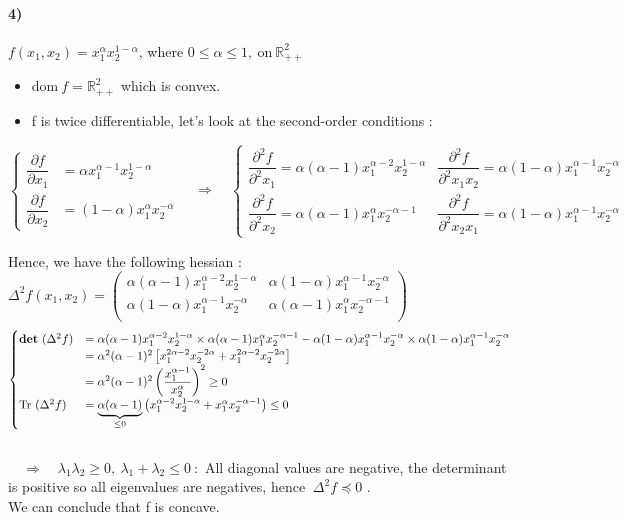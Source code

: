 \documentclass[12pt,a4paper]{article}
\begin{document}
\paragraph{4)} $ f(x_1,x_2)=x_1^{\alpha} x_2^{1-\alpha} $, where $ 0 \leq \alpha \leq 1,~\text{on}~ \mathbb{R}^2_{++} $
\begin{itemize}
	\item $ \text{dom} ~f=\mathbb{R}^2_{++} $ which is convex.
	\item f is twice differentiable, let's look at the second-order conditions :\\
 \end{itemize}
 \begin{center} 
$$	\begin{cases}
	\dfrac{\partial f}{\partial x_1} &=\alpha x_1^{\alpha -1}x_2^{1-\alpha} \\
	\dfrac{\partial f}{\partial x_2} &=(1-\alpha) x_1^{\alpha}x_2^{-\alpha} 
		\end{cases}
		\quad 
		\Rightarrow
		\quad
		\left\lbrace
		\begin{matrix}
			\dfrac{\partial^2 f}{\partial^2 x_1} = \alpha (\alpha -1)x_1^{\alpha-2}x_2^{1-\alpha} 
			&\dfrac{\partial^2 f}{\partial^2 x_1x_2} =\alpha (1-\alpha)x_1^{\alpha -1}x_2^{-\alpha}\\ 
			\dfrac{\partial^2 f}{\partial^2 x_2} = \alpha(\alpha-1)x_1^{\alpha}x_2^{-\alpha - 1} 
			&\dfrac{\partial^2 f}{\partial^2 x_2x_1} = \alpha (1-\alpha)x_1^{\alpha -1}x_2^{-\alpha}
		\end{matrix} \right.	$$
	\end{center}
	Hence, we have the following hessian : \def\arraystretch{2}  $ \Delta^2 f(x_1,x_2)=	\begin{pmatrix}
			 \alpha (\alpha -1)x_1^{\alpha-2}x_2^{1-\alpha} 
			&\alpha (1-\alpha)x_1^{\alpha -1}x_2^{-\alpha}\\ 
			\alpha (1-\alpha)x_1^{\alpha -1}x_2^{-\alpha}
			&\alpha(\alpha-1)x_1^{\alpha}x_2^{-\alpha - 1} \\
        \end{pmatrix} $\\
	$$\begin{cases} \text{\textbf{det}}~(\Delta^2 f )&= 
			 \alpha (\alpha -1)x_1^{\alpha-2}x_2^{1-\alpha} \times 
			\alpha(\alpha-1)x_1^{\alpha}x_2^{-\alpha - 1} -
			\alpha (1-\alpha)x_1^{\alpha -1}x_2^{-\alpha}\times 
			\alpha (1-\alpha)x_1^{\alpha -1}x_2^{-\alpha}\\
			&=\alpha^2(\alpha-1)^2 \left[ x_1^{2\alpha -2}x_2^{-2\alpha}+x_1^{2\alpha -2}x_2^{-2\alpha}\right]\\
			&=\alpha^2(\alpha-1)^2\left(\dfrac{x_1^{\alpha-1}}{x_2^{\alpha}}\right)^2\geq 0\\
			\text{Tr}~(\Delta^2f)~&=\underbrace{\alpha(\alpha-1)}_{\leq 0}\left(x_1^{\alpha-2}x_2^{1-\alpha}+x_1^{\alpha}x_2^{-\alpha-1}\right)\leq 0
\end{cases} $$\\
		$\quad \Rightarrow \quad \lambda_1\lambda_2\geq0,~\lambda_1+\lambda_2\leq0~: $ All diagonal values are negative,
		the determinant is positive so all eigenvalues are negatives, hence $~\Delta^2f \preceq 0$ .\\
We can conclude that f is concave. 
\end{document}
